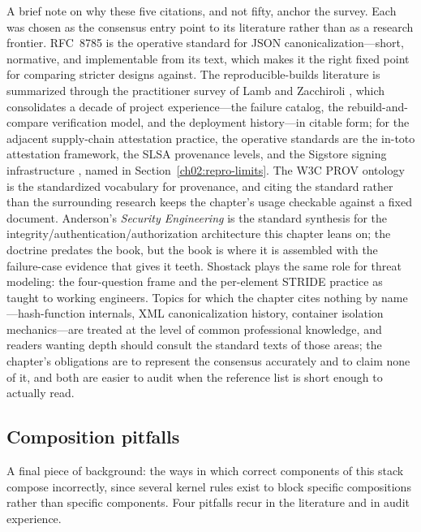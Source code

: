 A brief note on why these five citations, and not fifty, anchor
the survey. Each was chosen as the consensus entry point to its
literature rather than as a research frontier. RFC~8785 \cite{jcs}
is the operative standard for JSON canonicalization---short,
normative, and implementable from its text, which makes it the
right fixed point for comparing stricter designs against.
The reproducible-builds literature is summarized through the
practitioner survey of Lamb and Zacchiroli \cite{reprobuilds},
which consolidates a decade of project experience---the failure
catalog, the rebuild-and-compare verification model, and the
deployment history---in citable form; for the adjacent supply-chain
attestation practice, the operative standards are the in-toto
attestation framework, the SLSA provenance levels, and the Sigstore
signing infrastructure \cite{intoto,slsa,sigstore}, named in
Section~\ref{ch02:repro-limits}. The W3C PROV ontology
\cite{prov} is the standardized vocabulary for provenance, and
citing the standard rather than the surrounding research keeps the
chapter's usage checkable against a fixed document. Anderson's
\emph{Security Engineering} \cite{anderson} is the standard
synthesis for the integrity/authentication/authorization
architecture this chapter leans on; the doctrine predates the
book, but the book is where it is assembled with the failure-case
evidence that gives it teeth. Shostack \cite{shostack} plays the
same role for threat modeling: the four-question frame and the
per-element STRIDE practice as taught to working engineers.
Topics for which the chapter cites nothing by name---hash-function
internals, XML canonicalization history, container isolation
mechanics---are treated at the level of common professional
knowledge, and readers wanting depth should consult the standard
texts of those areas; the chapter's obligations are to represent
the consensus accurately and to claim none of it, and both are
easier to audit when the reference list is short enough to
actually read.

\subsection{Composition pitfalls}\label{ch02:pitfalls}

A final piece of background: the ways in which correct components
of this stack compose incorrectly, since several kernel rules exist
to block specific compositions rather than specific components.
Four pitfalls recur in the literature and in audit experience.

